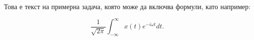 Това е текст на примерна задача, която може да включва формули, като например:

\begin{equation*}
  \frac 1{\sqrt{2\pi}} \int^\infty_{-\infty}x(t)e^{-i\omega t}dt.
\end{equation*}
